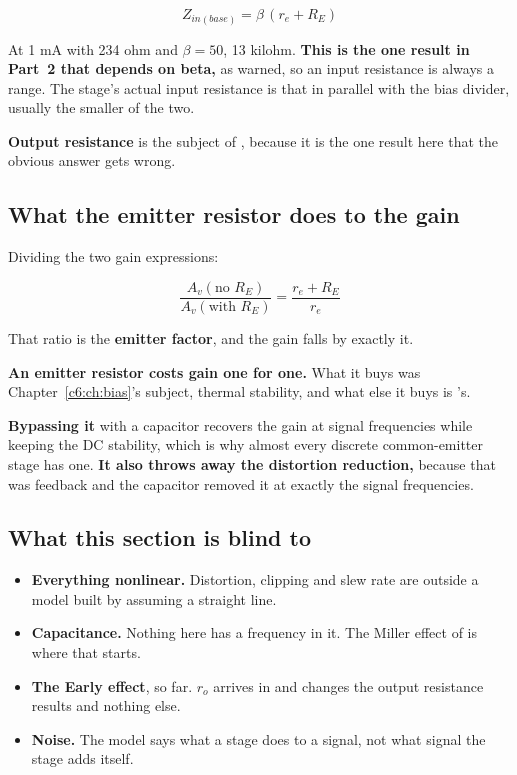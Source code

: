 \[
  Z_{in(base)} = \beta\,(r_e + R_E)
\]

At 1 mA with 234 ohm and $\beta = 50$, 13 kilohm. \textbf{This is the one result in Part~2 that depends on beta,} as  warned, so an input resistance is always a range. The stage's actual input resistance is that in parallel with the bias divider, usually the smaller of the two.

\textbf{Output resistance} is the subject of , because it is the one result here that the obvious answer gets wrong.

\subsection{What the emitter resistor does to the gain}
\label{c7:sec:a5}
Dividing the two gain expressions:

\[
  \frac{A_v(\text{no } R_E)}{A_v(\text{with } R_E)} = \frac{r_e + R_E}{r_e}
\]

That ratio is the \textbf{emitter factor}, and the gain falls by exactly it.


\textbf{An emitter resistor costs gain one for one.} What it buys was Chapter~\ref{c6:ch:bias}'s subject, thermal stability, and what else it buys is 's.

\textbf{Bypassing it} with a capacitor recovers the gain at signal frequencies while keeping the DC stability, which is why almost every discrete common-emitter stage has one. \textbf{It also throws away the distortion reduction,} because that was feedback and the capacitor removed it at exactly the signal frequencies.

\subsection{What this section is blind to}
\label{c7:sec:a6}
\begin{itemize}
  \item \textbf{Everything nonlinear.} Distortion, clipping and slew rate are outside a model built by assuming a straight line.
  \item \textbf{Capacitance.} Nothing here has a frequency in it. The Miller effect of  is where that starts.
  \item \textbf{The Early effect}, so far. $r_o$ arrives in  and changes the output resistance results and nothing else.
  \item \textbf{Noise.} The model says what a stage does to a signal, not what signal the stage adds itself.
\end{itemize}

